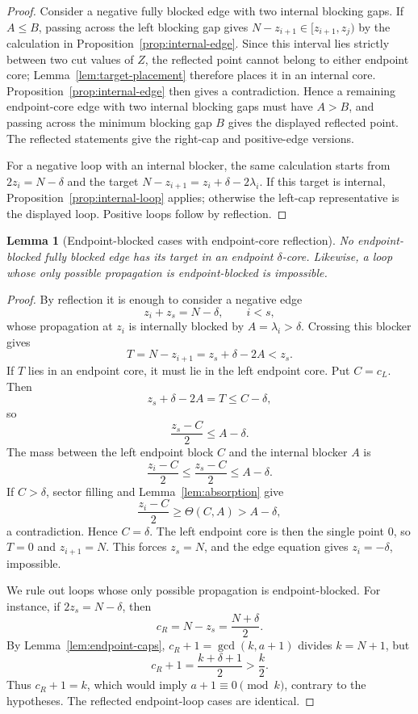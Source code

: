 \documentclass[11pt]{article}
\newtheorem{lemma}[theorem]{Lemma}
\begin{document}
\begin{proof}
Consider a negative fully blocked edge with two internal blocking gaps.  If \(A\le B\), passing across the left blocking gap gives \(N-z_{i+1}\in [z_{i+1},z_j)\) by the calculation in Proposition~\ref{prop:internal-edge}.  Since this interval lies strictly between two cut values of \(Z\), the reflected point cannot belong to either endpoint core; Lemma~\ref{lem:target-placement} therefore places it in an internal core.  Proposition~\ref{prop:internal-edge} then gives a contradiction.  Hence a remaining endpoint-core edge with two internal blocking gaps must have \(A>B\), and passing across the minimum blocking gap \(B\) gives the displayed reflected point.  The reflected statements give the right-cap and positive-edge versions.

For a negative loop with an internal blocker, the same calculation starts from \(2z_i=N-\delta\) and the target \(N-z_{i+1}=z_i+\delta-2\lambda_i\).  If this target is internal, Proposition~\ref{prop:internal-loop} applies; otherwise the left-cap representative is the displayed loop.  Positive loops follow by reflection.
\end{proof}

\begin{lemma}[Endpoint-blocked cases with endpoint-core reflection]\label{lem:endpoint-blocked-endpoint-core}
No endpoint-blocked fully blocked edge has its target in an endpoint \(\delta\)-core.  Likewise, a loop whose only possible propagation is endpoint-blocked is impossible.
\end{lemma}

\begin{proof}
By reflection it is enough to consider a negative edge
\[
        z_i+z_s=N-\delta,
        \qquad i<s,
\]
whose propagation at \(z_i\) is internally blocked by \(A=\lambda_i>\delta\).  Crossing this blocker gives
\[
        T=N-z_{i+1}=z_s+\delta-2A<z_s.
\]
If \(T\) lies in an endpoint core, it must lie in the left endpoint core.  Put \(C=c_L\).  Then
\[
        z_s+\delta-2A=T\le C-\delta,
\]
so
\[
        \frac{z_s-C}{2}\le A-\delta.
\]
The mass between the left endpoint block \(C\) and the internal blocker \(A\) is
\[
        \frac{z_i-C}{2}
        \le \frac{z_s-C}{2}
        \le A-\delta.
\]
If \(C>\delta\), sector filling and Lemma~\ref{lem:absorption} give
\[
        \frac{z_i-C}{2}\ge \Theta(C,A)>A-\delta,
\]
a contradiction.  Hence \(C=\delta\).  The left endpoint core is then the single point \(0\), so \(T=0\) and \(z_{i+1}=N\).  This forces \(z_s=N\), and the edge equation gives \(z_i=-\delta\), impossible.

We rule out loops whose only possible propagation is endpoint-blocked.  For instance, if \(2z_s=N-\delta\), then
\[
        c_R=N-z_s=\frac{N+\delta}{2}.
\]
By Lemma~\ref{lem:endpoint-caps}, \(c_R+1=\gcd(k,a+1)\) divides \(k=N+1\), but
\[
        c_R+1=\frac{k+\delta+1}{2}>\frac k2.
\]
Thus \(c_R+1=k\), which would imply \(a+1\equiv0\pmod{k}\), contrary to the hypotheses.  The reflected endpoint-loop cases are identical.
\end{proof}
\end{document}
